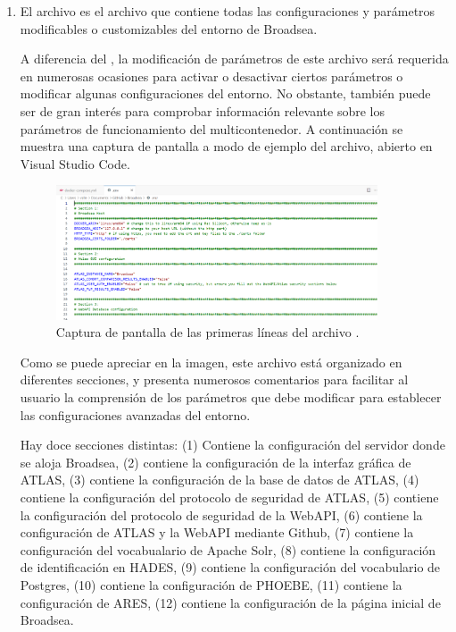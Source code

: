 \begin{enumerate}
    \item El archivo  es el archivo que contiene todas las configuraciones y parámetros modificables o customizables del entorno de Broadsea.

    A diferencia del , la modificación de parámetros de este archivo será requerida en numerosas ocasiones para activar o desactivar ciertos parámetros o modificar algunas configuraciones del entorno. No obstante, también puede ser de gran interés para comprobar información relevante sobre los parámetros de funcionamiento del multicontenedor. A continuación se muestra una captura de pantalla a modo de ejemplo del archivo, abierto en Visual Studio Code.

\begin{figure}[H]
    \centering
    \includegraphics[width=0.90\textwidth]{figures/envFile.png}
    \caption{Captura de pantalla de las primeras líneas del archivo .}
    \label{fig:envFile}    
\end{figure}

    Como se puede apreciar en la imagen, este archivo está organizado en diferentes secciones, y presenta numerosos comentarios para facilitar al usuario la comprensión de los parámetros que debe modificar para establecer las configuraciones avanzadas del entorno.
    
    Hay doce secciones distintas: (1) Contiene la configuración del servidor donde se aloja Broadsea, (2) contiene la configuración de la interfaz gráfica de ATLAS, (3) contiene la configuración de la base de datos de ATLAS, (4) contiene la configuración del protocolo de seguridad de ATLAS, (5) contiene la configuración del protocolo de seguridad de la WebAPI, (6) contiene la configuración de ATLAS y la WebAPI mediante Github, (7) contiene la configuración del vocabualario de Apache Solr,  (8) contiene la configuración de identificación en HADES, (9) contiene la configuración del vocabulario de Postgres, (10) contiene la configuración de PHOEBE, (11) contiene la configuración de ARES, (12) contiene la configuración de la página inicial de Broadsea.
        
\end{enumerate}

